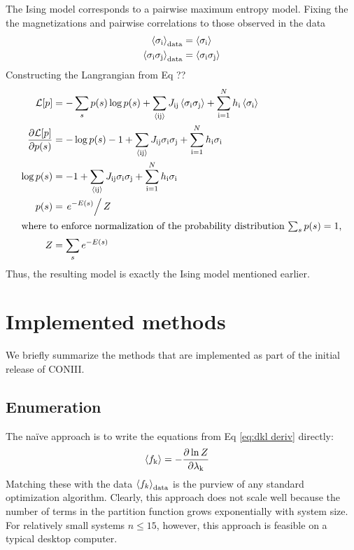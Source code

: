 \documentclass[aps,prl,twocolumn]{revtex4-1}
\begin{document}
The Ising model corresponds to a pairwise maximum entropy model.
Fixing the the magnetizations and pairwise correlations to those observed in the data
\begin{align}
	\left<\sigma_{\rm i}\right>_{\rm data} &= \left<\sigma_{\rm i}\right>\\
	\left<\sigma_{\rm i}\sigma_{\rm j}\right>_{\rm data} &= \left<\sigma_{\rm i}\sigma_{\rm j}\right>
\end{align}
Constructing the Langrangian from Eq ??
\begin{align}
	\mathcal{L}[p] &= -\sum_s p(s)\log p(s) +\sum_{\rm \left<ij\right>} J_{\rm ij}\left<\sigma_{\rm i}\sigma_{\rm j}\right> +\sum_{\rm i=1}^Nh_{\rm i}\left<\sigma_{\rm i}\right>\\
	\frac{\partial\mathcal{L}[p]}{\partial p(s)} &= -\log p(s)-1 +\sum_{\rm \left<ij\right>} J_{\rm ij}\sigma_{\rm i}\sigma_{\rm j} +\sum_{\rm i=1}^Nh_{\rm i}\sigma_{\rm i}\\
	\log p(s) &= -1 +\sum_{\rm \left<ij\right>} J_{\rm ij}\sigma_{\rm i}\sigma_{\rm j} +\sum_{\rm i=1}^Nh_{\rm i}\sigma_{\rm i}\\
	p(s) &= \left.e^{-E(s)}\right/Z\\
\intertext{where to enforce normalization of the probability distribution $\sum_s p(s) = 1$,}
	Z &= \sum_s e^{-E(s)}
\end{align}
Thus, the resulting model is exactly the Ising model mentioned earlier.



\section{Implemented methods}
We briefly summarize the methods that are implemented as part of the initial release of CONIII.

\subsection{Enumeration}
The na\"{i}ve approach is to write the equations from Eq \ref{eq:dkl deriv} directly:
\begin{align}
	\left<f_{\rm k}\right> &= -\frac{\partial \ln Z}{\partial \lambda_{\rm k}}
\end{align}
Matching these with the data $\left<f_k\right>_{\rm data}$ is the purview of any standard optimization algorithm. Clearly, this approach does not scale well because the number of terms in the partition function grows exponentially with system size. For relatively small systems $n\leq15$, however, this approach is feasible on a typical desktop computer.
\end{document}
